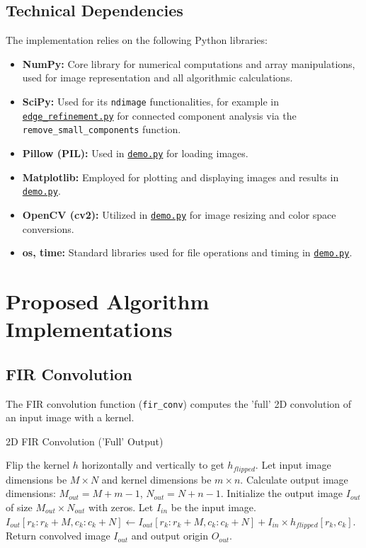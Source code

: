 \documentclass[12pt,a4paper]{article}
\begin{document}
\subsection{Technical Dependencies}
The implementation relies on the following Python libraries:
\begin{itemize}
    \item \textbf{NumPy:} Core library for numerical computations and array manipulations, used for image representation and all algorithmic calculations.
    \item \textbf{SciPy:} Used for its \texttt{ndimage} functionalities, for example in \href{Code/result_refinement.py}{\texttt{edge\_refinement.py}} for connected component analysis via the \texttt{remove\_small\_components} function.
    \item \textbf{Pillow (PIL):} Used in \href{Code/demo.py}{\texttt{demo.py}} for loading images.
    \item \textbf{Matplotlib:} Employed for plotting and displaying images and results in \href{Code/demo.py}{\texttt{demo.py}}.
    \item \textbf{OpenCV (cv2):} Utilized in \href{Code/demo.py}{\texttt{demo.py}} for image resizing and color space conversions.
    \item \textbf{os, time:} Standard libraries used for file operations and timing in \href{Code/demo.py}{\texttt{demo.py}}.
\end{itemize}


\section{Proposed Algorithm Implementations}

\subsection{FIR Convolution}\label{subsec:fir_convolution_imp}


The FIR convolution function (\texttt{fir\_conv}) computes the 'full' 2D convolution of an input image with a kernel.

\begin{algorithm}[H]
    \caption{2D FIR Convolution ('Full' Output)}
    \begin{algorithmic}[1]
        \State Flip the kernel $h$ horizontally and vertically to get $h_{flipped}$.
        \State Let input image dimensions be $M \times N$ and kernel dimensions be $m \times n$.
        \State Calculate output image dimensions: $M_{out} = M + m - 1$, $N_{out} = N + n - 1$.
        \State Initialize the output image $I_{out}$ of size $M_{out} \times N_{out}$ with zeros.
                \State Let $I_{in}$ be the input image.
                \State $I_{out}[r_k : r_k+M, c_k : c_k+N] \gets I_{out}[r_k : r_k+M, c_k : c_k+N] + I_{in} \times h_{flipped}[r_k, c_k]$.
            \EndIf
        \EndFor
        \State Return convolved image $I_{out}$ and output origin $O_{out}$.
    \end{algorithmic}
\end{algorithm}
\end{document}
